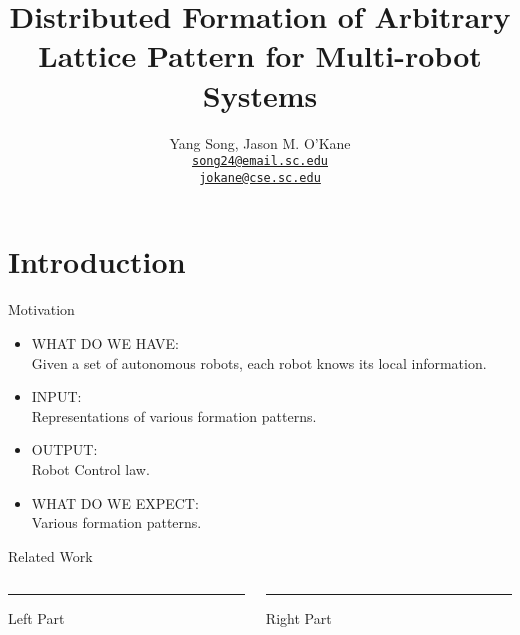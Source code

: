 \documentclass[10pt]{beamer}
\title{Distributed Formation of Arbitrary Lattice Pattern for
  Multi-robot Systems}
\author{
  Yang Song, Jason M. O'Kane\\
  \href{mailto:song24@email.sc.edu}{{\tt song24@email.sc.edu} \\
  \href{mailto:jokane@cse.sc.edu}{\tt jokane@cse.sc.edu}}
}
\institute[
  Dept.\ of Computer Science and Engineering\\
  University of South Carolina
] %
{%
  Dept. of Computer Science and Engineering\\
  University of South Carolina
  
}
\begin{document}
\begin{frame}[plain] %
  \titlepage
\end{frame}


\section{Introduction}
\begin{frame}{Motivation}{}
\begin{block}{}
  \begin{itemize}
  \item<1-> {\textcolor{scred}{\large WHAT DO WE HAVE:}}\\
    Given a set of autonomous robots, each robot knows its local information.
  \item<2-> {\textcolor{scred}{\large INPUT:}}\\
    Representations of various formation patterns.
  \item<3-> {\textcolor{scred}{\large OUTPUT:}}\\
    Robot Control law.
  \item<4-> {\textcolor{scred}{\large WHAT DO WE EXPECT:}}\\
    Various formation patterns.
  \end{itemize}
\end{block}
\end{frame}
\begin{frame}{Related Work}{}
  \begin{block}{}
    \begin{columns}[T] %
      \begin{column}{.48\textwidth}
        \color{red}\rule{\linewidth}{4pt}

        Left Part
      \end{column}%
      \hfill%
      \begin{column}{.48\textwidth}
        \color{blue}\rule{\linewidth}{4pt}

        Right Part
      \end{column}%
    \end{columns}
\end{block}
\end{frame}
\end{document}
